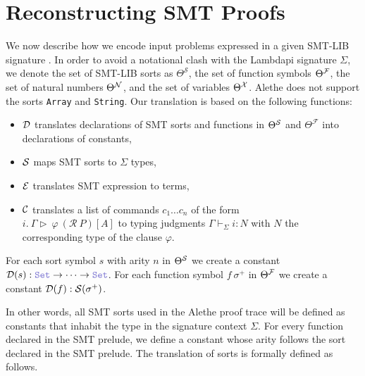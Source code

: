 \chapter{Reconstructing SMT Proofs}\label{ch:reconstruction}

We now describe how we encode input problems expressed in a given
SMT-LIB signature \cite[\S 5.2.1]{smtlib}. In order to avoid a notational clash with the Lambdapi signature $\Sigma$, we denote the set of SMT-LIB sorts as $\Theta^\mathcal{S}$, the set of function symbols $\Theta^\cal{F}$, the set of natural numbers $\Theta^\cal{N}$, and the set of variables $\Theta^\cal{X}$.
Alethe does not support the sorts \texttt{Array} and \texttt{String}. Our translation is based on the following functions:
\begin{itemize}
\item $\cal{D}$ translates declarations of SMT sorts and functions in $\Theta^\cal{S}$ and $\Theta^\mathcal{F}$ into declarations of constants,
\item $\cal{S}$ maps SMT sorts to $\Sigma$ types,
\item $\cal{E}$ translates SMT expression to \lpm terms,
\item $\cal{C}$ translates a list of commands  $c_1 \dots c_n$ of the form\\
  $i.~\Gamma \triangleright~\varphi~(\mathcal{R}~P)[A]$ to typing judgments $\Gamma \vdash_\Sigma i : N$ with $N$ the corresponding type of the clause $\varphi$.
\end{itemize}

\smallskip

\begin{definition}
For each sort symbol $s$ with arity $n$ in $\Theta^\cal{S}$ we create a constant $\cal{D}(s) : \set \ra \dots \ra \set$.
For each function symbol $f~\sigma^+$ in $\Theta^\cal{F}$ we create a constant $\cal{D}(f) : \cal{S}(\sigma^+)$.
\label{def:function-d}
\end{definition}

\smallskip

In other words, all SMT sorts used in the Alethe proof trace will be defined as constants that inhabit the type \set{} in the signature context $\Sigma$.
For every function declared in the SMT prelude, we define a constant whose arity follows the sort declared in the SMT prelude. The translation of sorts is formally defined as follows.

